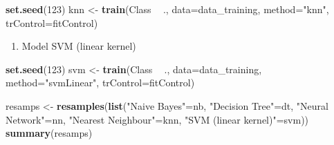 \documentclass[]{article}
\newenvironment{Shaded}{\begin{snugshade}}{\end{snugshade}}
\newcommand{\DataTypeTok}[1]{\textcolor[rgb]{0.13,0.29,0.53}{#1}}
\newcommand{\DecValTok}[1]{\textcolor[rgb]{0.00,0.00,0.81}{#1}}
\newcommand{\KeywordTok}[1]{\textcolor[rgb]{0.13,0.29,0.53}{\textbf{#1}}}
\newcommand{\NormalTok}[1]{#1}
\newcommand{\OperatorTok}[1]{\textcolor[rgb]{0.81,0.36,0.00}{\textbf{#1}}}
\newcommand{\StringTok}[1]{\textcolor[rgb]{0.31,0.60,0.02}{#1}}
\providecommand{\tightlist}{%
  \setlength{\itemsep}{0pt}\setlength{\parskip}{0pt}}
\begin{document}
\begin{Shaded}
	\begin{Highlighting}[]
\KeywordTok{set.seed}\NormalTok{(}\DecValTok{123}\NormalTok{)}
\NormalTok{knn <-}\StringTok{ }\KeywordTok{train}\NormalTok{(Class }\OperatorTok{~}\StringTok{ }\NormalTok{., }
	\DataTypeTok{data=}\NormalTok{data_training, }
	\DataTypeTok{method=}\StringTok{"knn"}\NormalTok{,}
	\DataTypeTok{trControl=}\NormalTok{fitControl)}
	\end{Highlighting}
\end{Shaded}

\begin{enumerate}
	\def\labelenumi{\arabic{enumi}.}
	\setcounter{enumi}{4}
	\tightlist
	\item
	Model SVM (linear kernel)
\end{enumerate}

\begin{Shaded}
	\begin{Highlighting}[]
\KeywordTok{set.seed}\NormalTok{(}\DecValTok{123}\NormalTok{)}
\NormalTok{svm <-}\StringTok{ }\KeywordTok{train}\NormalTok{(Class }\OperatorTok{~}\StringTok{ }\NormalTok{., }
	\DataTypeTok{data=}\NormalTok{data_training, }
	\DataTypeTok{method=}\StringTok{"svmLinear"}\NormalTok{,}
	\DataTypeTok{trControl=}\NormalTok{fitControl)}
	\end{Highlighting}
\end{Shaded}

\begin{Shaded}
	\begin{Highlighting}[]
\NormalTok{resamps <-}\StringTok{ }\KeywordTok{resamples}\NormalTok{(}\KeywordTok{list}\NormalTok{(}\StringTok{"Naive Bayes"}\NormalTok{=nb,}
			\StringTok{"Decision Tree"}\NormalTok{=dt,}
			\StringTok{"Neural Network"}\NormalTok{=nn,}
			\StringTok{"Nearest Neighbour"}\NormalTok{=knn,}
			\StringTok{"SVM (linear kernel)"}\NormalTok{=svm))}
\KeywordTok{summary}\NormalTok{(resamps)}
	\end{Highlighting}
\end{Shaded}
\end{document}
